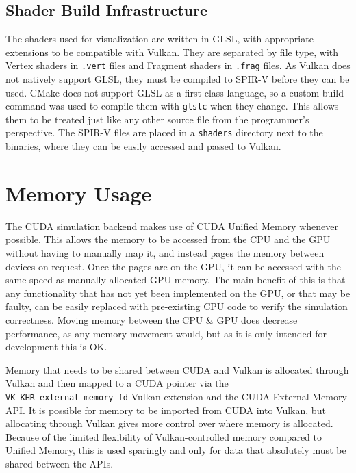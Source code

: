 \subsection{Shader Build Infrastructure} %
The shaders used for visualization are written in GLSL, with appropriate extensions to be compatible with Vulkan.
They are separated by file type, with Vertex shaders in \texttt{.vert} files and Fragment shaders in \texttt{.frag} files.
As Vulkan does not natively support GLSL, they must be compiled to SPIR-V before they can be used.
CMake does not support GLSL as a first-class language, so a custom build command was used to compile them with \texttt{glslc}\cite{GoogleLLCShaderc} when they change.
This allows them to be treated just like any other source file from the programmer's perspective.
The SPIR-V files are placed in a \texttt{shaders} directory next to the binaries, where they can be easily accessed and passed to Vulkan.

\section{Memory Usage}
The CUDA simulation backend makes use of CUDA Unified Memory\cite{Harris2017UnifiedBlog} whenever possible.
This allows the memory to be accessed from the CPU and the GPU without having to manually map it, and instead pages the memory between devices on request.
Once the pages are on the GPU, it can be accessed with the same speed as manually allocated GPU memory.
The main benefit of this is that any functionality that has not yet been implemented on the GPU, or that may be faulty, can be easily replaced with pre-existing CPU code to verify the simulation correctness.
Moving memory between the CPU \& GPU does decrease performance, as any memory movement would, but as it is only intended for development this is OK.

Memory that needs to be shared between CUDA and Vulkan is allocated through Vulkan and then mapped to a CUDA pointer via the \texttt{VK\_KHR\_external\_memory\_fd} Vulkan extension\cite{tool:VulkanKHRExternalMemoryFD} and the CUDA External Memory API\cite{NVIDIAExternalInteroperability}.
It is possible for memory to be imported from CUDA into Vulkan, but allocating through Vulkan gives more control over where memory is allocated.
Because of the limited flexibility of Vulkan-controlled memory compared to Unified Memory, this is used sparingly and only for data that absolutely must be shared between the APIs.

